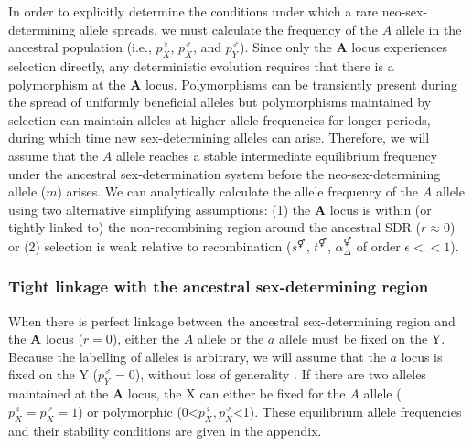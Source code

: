 \documentclass[12pt]{article}
\begin{document}
In order to explicitly determine the conditions under which a rare neo-sex-determining allele spreads, we must calculate the frequency of the $A$ allele in the ancestral population (i.e., $p^\female_X$, $p^\male_X$, and $p^\male_Y$). 
Since only the \textbf{A} locus experiences selection directly, any deterministic evolution requires that there is a polymorphism at the \textbf{A} locus. 
Polymorphisms can be transiently present during the spread of uniformly beneficial alleles but polymorphisms maintained by selection can maintain alleles at higher allele frequencies for longer periods, during which time new sex-determining alleles can arise. 
Therefore, we will assume that the $A$ allele reaches a stable intermediate equilibrium frequency under the ancestral sex-determination system before the neo-sex-determining allele ($m$) arises. 
We can analytically calculate the allele frequency of the $A$ allele using two alternative simplifying assumptions: 
(1) the \textbf{A} locus is within (or tightly linked to) the non-recombining region around the ancestral SDR ($r \approx 0$) or (2) selection is weak relative to recombination ($s^\Hermaphrodite$, $t^\Hermaphrodite$, $\alpha_{\Delta}^\Hermaphrodite$ of order $\epsilon<<1$). 

\subsubsection*{Tight linkage with the ancestral sex-determining region}

When there is perfect linkage between the ancestral sex-determining region and the \textbf{A} locus ($r=0$), either the $A$ allele or the $a$ allele must be fixed on the Y. 
Because the labelling of alleles is arbitrary, we will assume that the $a$ locus is fixed on the Y ($p^\male_Y=0$), without loss of generality . 
If there are two alleles maintained at the \textbf{A} locus, the X can either be fixed for the $A$ allele ($p^\female_X=p^\male_X=1$) or polymorphic (0<$p^\female_X, p^\male_X$<1). 
These equilibrium allele frequencies and their stability conditions are given in the appendix.
\end{document}
